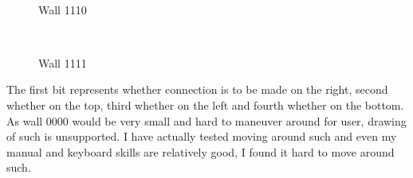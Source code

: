 \documentclass[11pt,a4paper]{report}
\newenvironment{img}{
	\begin{center}
		\begin{figure}[H]
			\begin{center}
			
}{
	\end{center}
		\end{figure}
			\end{center}
}
\begin{document}
				\begin{img}
					\\
					\caption{Wall 1110}
				\end{img}
				\begin{img}
					\\
					\caption{Wall 1111}
				\end{img}
				
			
				The first bit represents whether connection is to be made on the right, second whether on the top, third whether on the left and fourth whether on the bottom. As wall 0000 would be very small and hard to maneuver around for user, drawing of such is unsupported. I have actually tested moving around such and even my manual and keyboard skills are relatively good, I found it hard to move around such.
				
\end{document}
